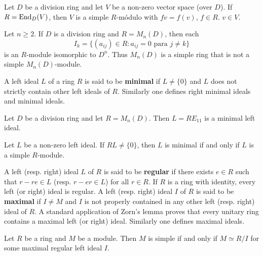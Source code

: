 \begin{example}
	Let $D$ be a division ring and let $V$ be a non-zero vector space (over $D$). If 
	$R=\operatorname{End}_D(V)$, then $V$ is a simple $R$-módulo with $fv=f(v)$, $f\in R$.
	$v\in V$. 
\end{example}

\begin{example}
	\label{exa:I_k}
	Let $n\geq2$.  If $D$ is a division ring and $R=M_n(D)$, then each 
	\[
	I_k=\{ (a_{ij})\in R:a_{ij}=0\text{ para $j\ne k$}\}
	\]
	is an $R$-module isomorphic to $D^n$. 
	Thus $M_{n}(D)$ is a simple ring that is not a simple $M_n(D)$-module.
\end{example}

A left ideal $L$ of a ring $R$ is said to be \textbf{minimal} if $L\ne\{0\}$ and 
$L$ does not strictly contain other left ideals of $R$. Similarly one defines
right minimal ideals and minimal ideals. 

\begin{example}
	Let $D$ be a division ring and let $R=M_n(D)$. Then $L=RE_{11}$ 
	is a minimal left ideal.
\end{example}

\begin{example}
	Let $L$ be a non-zero left ideal. If $RL\ne\{0\}$, then
	$L$ is minimal if and only if $L$ is a simple $R$-module. 
\end{example}

A left (resp. right) ideal $L$ of $R$ is said to be \textbf{regular} if
there exists $e\in R$ such that $r-re\in L$ (resp.  $r-er\in L$) for all $r\in R$. 
If $R$ is a ring with identity, every left (or right) ideal is regular. 
A left (resp. right) ideal $I$ of $R$ is said to be \textbf{maximal} if $I\ne M$ and $I$ is not properly contained 
in any other left (resp. right) ideal of $R$. 
A standard
application of Zorn's lemma proves that every unitary ring contains a maximal left (or right) ideal.  
Similarly one defines maximal ideals. 


\begin{proposition}
	\label{proposition:R/I}
	Let $R$ be a ring and $M$ be a module. Then $M$ is simple if and only if
	$M\simeq R/I$ for some maximal regular left ideal $I$. 	
\end{proposition}

